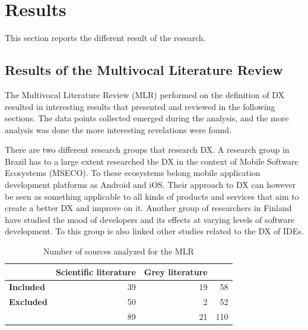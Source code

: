 \documentclass[english, 12pt, a4paper, sci, utf8, a-1b, online]{aaltothesis}
\begin{document}
\clearpage
\section{Results}

This section reports the different result of the research.

\subsection{Results of the Multivocal Literature Review} \label{section:result-of-mlr}

The Multivocal Literature Review (MLR) performed on the definition of DX resulted in interesting results that presented and reviewed in the following sections. The data points collected emerged during the analysis, and the more analysis was done the more interesting revelations were found.

There are two different research groups that research DX. A research group in Brazil has to a large extent researched the DX in the context of Mobile Software Ecosystems (MSECO). To these ecosystems belong mobile application development platforms as Android and iOS. Their approach to DX can however be seen as something applicable to all kinds of products and services that aim to create a better DX and improve on it. Another group of researchers in Finland have studied the mood of developers and its effects at varying levels of software development. To this group is also linked other studies related to the DX of IDEs.


\begin{table}[ht]
  \begin{center}
    \begin{tabular}{l | r r | r}
                        & \textbf{Scientific literature} & \textbf{Grey literature} &     \\
      \hline
      \textbf{Included} & 39                             & 19                       & 58  \\
      \textbf{Excluded} & 50                             & 2                        & 52  \\
      \hline
                        & 89                             & 21                       & 110
    \end{tabular}
    \captionsetup{width=0.6\textwidth}
    \caption{Number of sources analyzed for the MLR}
    \label{table:number-of-sources}
  \end{center}
\end{table}
\end{document}
